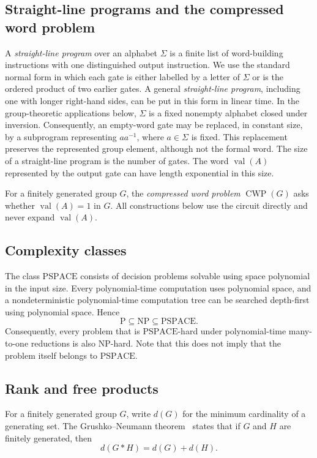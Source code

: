 \documentclass[a4paper,11pt,reqno]{amsart}
\theoremstyle{definition}
\theoremstyle{remark}
\DeclareMathOperator{\CWP}{CWP}
\DeclareMathOperator{\val}{val}
\begin{document}
	\subsection*{Straight-line programs and the compressed word problem}
	A \emph{straight-line program} over an alphabet $\Sigma$ is a
	finite list of word-building instructions with one distinguished output instruction. We use
	the standard normal form in which each gate is either labelled by a
	letter of $\Sigma$ or is the ordered product of two earlier gates.
	A general \emph{straight-line program}, including one with longer right-hand sides, can be put in this form in linear time. In the group-theoretic applications below, $\Sigma$ is a fixed nonempty alphabet closed under inversion. Consequently, an empty-word gate may be replaced, in constant size, by a subprogram representing $aa^{-1}$, where $a\in\Sigma$ is fixed. This replacement preserves the represented group element, although not the formal word. The size of a straight-line program is the number of gates.
	The word $\val(A)$ represented by the output gate can have length exponential in this size.
	
	For a finitely generated group $G$, the \emph{compressed word problem}
	$\CWP(G)$ asks whether $\val(A)=1$ in $G$. All constructions below use
	the circuit directly and never expand $\val(A)$.
	
	\subsection*{Complexity classes}	
	The class $\mathrm{PSPACE}$ consists of decision problems solvable using space polynomial in the input size. Every polynomial-time computation uses polynomial space, and a nondeterministic polynomial-time computation tree can be searched depth-first using polynomial space. Hence
	\[
	\mathrm{P}\subseteq\mathrm{NP}\subseteq\mathrm{PSPACE}.
	\]
	Consequently, every problem that is $\mathrm{PSPACE}$-hard under
	polynomial-time many-to-one reductions is also $\mathrm{NP}$-hard. 
	Note that this does not imply that the problem itself belongs to $\mathrm{PSPACE}$.
	
	\subsection*{Rank and free products}
	For a finitely generated group $G$, write $d(G)$ for the minimum
	cardinality of a generating set. The Grushko--Neumann
	theorem~\cite{Neumann1943} states that if $G$ and $H$ are finitely generated,
	then
	\[
	d(G*H)=d(G)+d(H).
	\]
	
\end{document}
